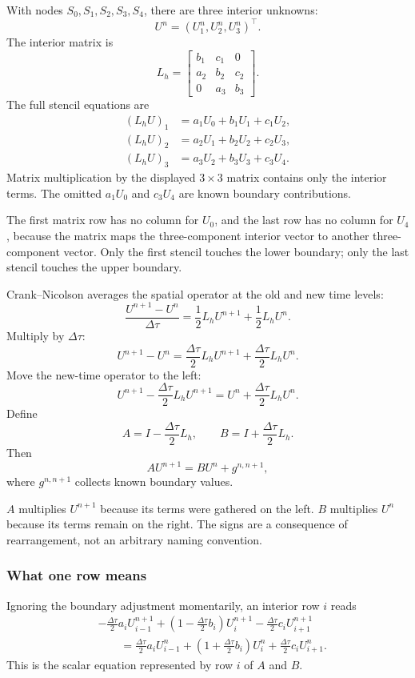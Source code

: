 With nodes \(S_0,S_1,S_2,S_3,S_4\), there are three interior unknowns:
\[
  U^n=(U_1^n,U_2^n,U_3^n)^\top.
\]
The interior matrix is
\[
  L_h=
  \begin{bmatrix}
    b_1 & c_1 & 0\\
    a_2 & b_2 & c_2\\
    0 & a_3 & b_3
  \end{bmatrix}.
\]
The full stencil equations are
\begin{align*}
  (L_hU)_1&=a_1U_0+b_1U_1+c_1U_2,\\
  (L_hU)_2&=a_2U_1+b_2U_2+c_2U_3,\\
  (L_hU)_3&=a_3U_2+b_3U_3+c_3U_4.
\end{align*}
Matrix multiplication by the displayed \(3\times3\) matrix contains only the
interior terms. The omitted \(a_1U_0\) and \(c_3U_4\) are known boundary
contributions.

\begin{commonconfusion}
The first matrix row has no column for \(U_0\), and the last row has no column
for \(U_4\), because the matrix maps the three-component interior vector to
another three-component vector. Only the first stencil touches the lower
boundary; only the last stencil touches the upper boundary.
\end{commonconfusion}

Crank--Nicolson averages the spatial operator at the old and new time levels:
\[
  \frac{U^{n+1}-U^n}{\Delta\tau}
  =
  \frac12L_hU^{n+1}
  +\frac12L_hU^n.
\]
Multiply by \(\Delta\tau\):
\[
  U^{n+1}-U^n
  =
  \frac{\Delta\tau}{2}L_hU^{n+1}
  +\frac{\Delta\tau}{2}L_hU^n.
\]
Move the new-time operator to the left:
\[
  U^{n+1}
  -\frac{\Delta\tau}{2}L_hU^{n+1}
  =
  U^n
  +\frac{\Delta\tau}{2}L_hU^n.
\]
Define
\[
  A=I-\frac{\Delta\tau}{2}L_h,
  \qquad
  B=I+\frac{\Delta\tau}{2}L_h.
\]
Then
\[
  AU^{n+1}=BU^n+g^{n,n+1},
\]
where \(g^{n,n+1}\) collects known boundary values.

\begin{commonconfusion}
\(A\) multiplies \(U^{n+1}\) because its terms were gathered on the left.
\(B\) multiplies \(U^n\) because its terms remain on the right. The signs are a
consequence of rearrangement, not an arbitrary naming convention.
\end{commonconfusion}

\subsubsection{What one row means}
Ignoring the boundary adjustment momentarily, an interior row \(i\) reads
\begin{align*}
 &-\frac{\Delta\tau}{2}a_iU_{i-1}^{n+1}
 +\left(1-\frac{\Delta\tau}{2}b_i\right)U_i^{n+1}
 -\frac{\Delta\tau}{2}c_iU_{i+1}^{n+1}\\
 &\qquad=
 \frac{\Delta\tau}{2}a_iU_{i-1}^{n}
 +\left(1+\frac{\Delta\tau}{2}b_i\right)U_i^{n}
 +\frac{\Delta\tau}{2}c_iU_{i+1}^{n}.
\end{align*}
This is the scalar equation represented by row \(i\) of \(A\) and \(B\).


